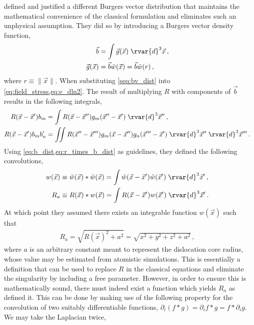  defined and justified a different Burgers vector distribution that maintains the mathematical convenience of the classical formulation and eliminates such an unphysical assumption. They did so by introducing a Burgers vector density function,
\begin{subequations}\label{eq:b_dist}
  \begin{align}
    \vec{b}          & = \int \vec{g}(\vec{x}) \;\rvar{d}^{3} \vec{x}\label{seq:bv_dist}\,, \\
    \vec{g}(\vec{x}) & = \vec{b} \tilde{w}(\vec{x}) = \vec{b} \tilde{w}(r)\,,
  \end{align}
\end{subequations}
where $ r \equiv \lVert \vec{x} \rVert $. When substituting \cref{seq:bv_dist} into \cref{eq:field_stress,eq:e_dln2}. The result of multiplying $ R $ with components of $ \vec{b} $ results in the following integrals,
\begin{subequations}\label{eq:r_times_b_dist}
  \begin{align}
    R(\vec{x} - \vec{x}') b_{m}        & = \int R(\vec{x} - \vec{x}'') g_{m}(\vec{x}'' - \vec{x}') \;\rvar{d}^{3}\vec{x}''\,,                                                          \\
    R(\vec{x} - \vec{x}') b_{m} b'_{n} & = \iint R(\vec{x}'' - \vec{x}''') g_{m}(\vec{x} - \vec{x}'') g_{n}(\vec{x}''' - \vec{x}') \;\rvar{d}^{3}\vec{x}'' \;\rvar{d}^{3}\vec{x}'''\,.
  \end{align}
\end{subequations}
Using \cref{eq:b_dist,eq:r_times_b_dist} as guidelines, they defined the following convolutions,
\begin{subequations}
  \begin{align}
    w(\vec{x}) & \equiv \tilde{w}(\vec{x}) * \tilde{w}(\vec{x}) = \int \tilde{w}(\vec{x}-\vec{x}')\tilde{w}(\vec{x}')\; \rvar{d}^{3} \vec{x}'\,, \\
    R_{a}      & \equiv R(\vec{x}) * w(\vec{x}) = \int R(\vec{x} - \vec{x}') w(\vec{x}') \;\rvar{d}^{3} \vec{x}'\,.
  \end{align}
\end{subequations}
At which point they assumed there exists an integrable function $ w(\vec{x}) $ such that
\begin{align}
  R_{a} = \sqrt{R(\vec{x})^{2} + a^{2}} = \sqrt{x^{2} + y^{2} + z^{2} + a^{2}}\,,
\end{align}
where $ a $ is an arbitrary constant meant to represent the dislocation core radius, whose value may be estimated from atomistic simulations. This is essentially a definition that can be used to replace $ R $ in the classical equations and eliminate the singularity by including a free parameter. However, in order to ensure this is mathematically sound, there must indeed exist a function which yields $ R_{a} $ as \citet{a_non-singular_continuum_theory_of_dislocations} defined it. This can be done by making use of the following property for the convolution of two suitably differentiable functions, $ \partial_{i} (f*g) = \partial_{i}f * g = f * \partial_{i} g $. We may take the Laplacian twice,
